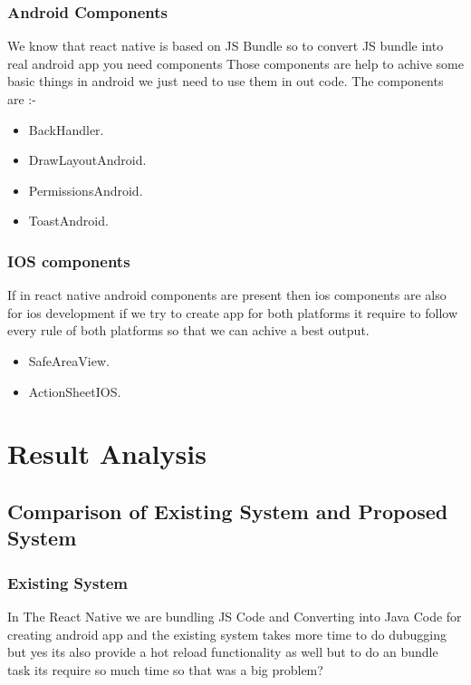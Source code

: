 \documentclass[12pt,a4paper]{report}
\begin{document}
\subsection{Android Components}
We know that react native is based on JS Bundle so to convert JS bundle into real android app you need components Those components are help to achive some basic things in android  we just need to use them in out code. The components are  :- 
\\
\begin{itemize}
  \item BackHandler.
  \item DrawLayoutAndroid.
  \item PermissionsAndroid.
  \item ToastAndroid.
\end{itemize}

\subsection{IOS components}
If in react native android components are present then ios components are also for ios development if we try to create app for both platforms it require to follow every rule of both platforms so that we can achive a best output.

\begin{itemize}
  \item SafeAreaView.
  \item ActionSheetIOS.
\end{itemize}

\newpage

\chapter{Result Analysis}
\section{Comparison of Existing System and Proposed System}
\subsection{ Existing System}
In The React Native we are bundling JS Code and Converting into Java Code for creating android app and the existing system takes more time to do dubugging but yes its also provide a hot reload functionality as well but to do an bundle task its require so much time so that was a big problem?
\end{document}
